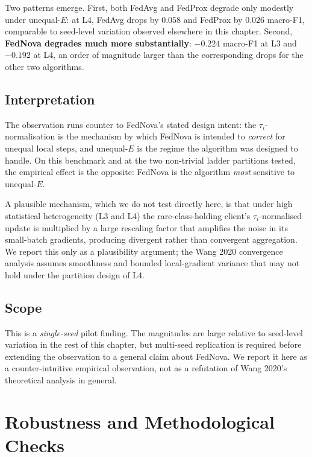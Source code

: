\documentclass[11pt,a4paper]{report}
\begin{document}
Two patterns emerge. First, both FedAvg and FedProx degrade only modestly
under unequal-$E$: at L4, FedAvg drops by $0.058$ and FedProx by $0.026$
macro-F1, comparable to seed-level variation observed elsewhere in this
chapter. Second, \textbf{FedNova degrades much more substantially}:
$-0.224$ macro-F1 at L3 and $-0.192$ at L4, an order of magnitude larger
than the corresponding drops for the other two algorithms.

\subsection{Interpretation}
The observation runs counter to FedNova's stated design intent: the
$\tau_i$-normalisation is the mechanism by which FedNova is intended to
\emph{correct} for unequal local steps, and unequal-$E$ is the regime
the algorithm was designed to handle. On this benchmark and at the two
non-trivial ladder partitions tested, the empirical effect is the
opposite: FedNova is the algorithm \emph{most} sensitive to unequal-$E$.

A plausible mechanism, which we do not test directly here, is that under
high statistical heterogeneity (L3 and L4) the rare-class-holding
client's $\tau_i$-normalised update is multiplied by a large rescaling
factor that amplifies the noise in its small-batch gradients, producing
divergent rather than convergent aggregation. We report this only as a
plausibility argument; the Wang 2020 convergence analysis assumes
smoothness and bounded local-gradient variance that may not hold under
the partition design of L4.

\subsection{Scope}
This is a \emph{single-seed} pilot finding. The magnitudes are large
relative to seed-level variation in the rest of this chapter, but
multi-seed replication is required before extending the observation to
a general claim about FedNova. We report it here as a counter-intuitive
empirical observation, not as a refutation of Wang 2020's theoretical
analysis in general.


\section{Robustness and Methodological Checks}
\label{sec:robustness-checks}
\end{document}
